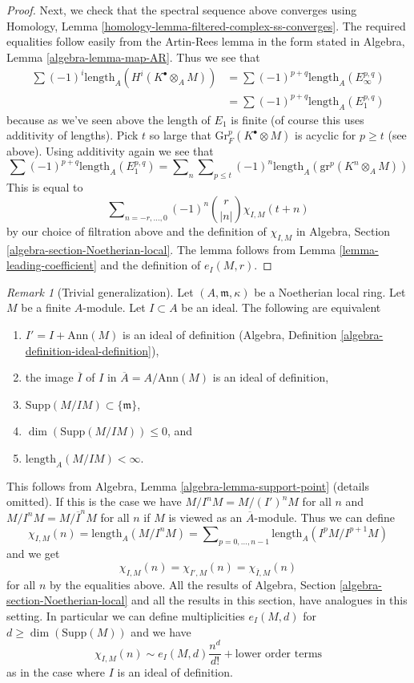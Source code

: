 \documentclass{stacks-project}
\theoremstyle{plain}
\theoremstyle{definition}
\theoremstyle{remark}
\newtheorem{remark}[subsection]{Remark}
\numberwithin{equation}{subsection}
\begin{document}
\begin{proof}
\medskip\noindent
Next, we check that the spectral sequence above converges
using Homology, Lemma \ref{homology-lemma-filtered-complex-ss-converges}.
The required equalities follow easily from the Artin-Rees lemma
in the form stated in Algebra, Lemma \ref{algebra-lemma-map-AR}.
Thus we see that
\begin{align*}
\sum (-1)^i\text{length}_A(H^i(K^\bullet \otimes_A M))
& =
\sum (-1)^{p + q} \text{length}_A(E_\infty^{p, q}) \\
& =
\sum (-1)^{p + q} \text{length}_A(E_1^{p, q})
\end{align*}
because as we've seen above the length of $E_1$ is finite
(of course this uses additivity of lengths). Pick $t$ so
large that $\text{Gr}^p_F(K^\bullet \otimes M)$
is acyclic for $p \geq t$ (see above). Using
additivity again we see that
$$
\sum (-1)^{p + q} \text{length}_A(E_1^{p, q}) =
\sum\nolimits_n \sum\nolimits_{p \leq t}
(-1)^n \text{length}_A(\text{gr}^p(K^n \otimes_A M))
$$
This is equal to
$$
\sum\nolimits_{n = -r, \ldots, 0} (-1)^n{r \choose |n|} \chi_{I, M}(t + n)
$$
by our choice of filtration above and the definition of $\chi_{I, M}$ in
Algebra, Section \ref{algebra-section-Noetherian-local}.
The lemma follows from Lemma \ref{lemma-leading-coefficient}
and the definition of $e_I(M, r)$.
\end{proof}

\begin{remark}[Trivial generalization]
\label{remark-trivial-generalization}
Let $(A, \mathfrak m, \kappa)$ be a Noetherian local ring.
Let $M$ be a finite $A$-module. Let $I \subset A$ be an ideal.
The following are equivalent
\begin{enumerate}
\item $I' = I + \text{Ann}(M)$ is an ideal of definition
(Algebra, Definition \ref{algebra-definition-ideal-definition}),
\item the image $\overline{I}$ of $I$ in $\overline{A} = A/\text{Ann}(M)$
is an ideal of definition,
\item $\text{Supp}(M/IM) \subset \{\mathfrak m\}$,
\item $\dim(\text{Supp}(M/IM)) \leq 0$, and
\item $\text{length}_A(M/IM) < \infty$.
\end{enumerate}
This follows from Algebra, Lemma \ref{algebra-lemma-support-point}
(details omitted). If this is the case we have $M/I^nM = M/(I')^nM$
for all $n$ and $M/I^nM = M/\overline{I}^nM$ for all $n$
if $M$ is viewed as an $\overline{A}$-module.
Thus we can define
$$
\chi_{I, M}(n) = \text{length}_A(M/I^nM) =
\sum\nolimits_{p = 0, \ldots, n - 1} \text{length}_A(I^pM/I^{p + 1}M)
$$
and we get
$$
\chi_{I, M}(n) = \chi_{I', M}(n) = \chi_{\overline{I}, M}(n)
$$
for all $n$ by the equalities above.
All the results of Algebra, Section \ref{algebra-section-Noetherian-local}
and all the results in this section, have analogues in this setting.
In particular we can define multiplicities $e_I(M, d)$ for
$d \geq \dim(\text{Supp}(M))$ and we have
$$
\chi_{I, M}(n) \sim e_I(M, d) \frac{n^d}{d!} + \text{lower order terms}
$$
as in the case where $I$ is an ideal of definition.
\end{remark}
\end{document}
